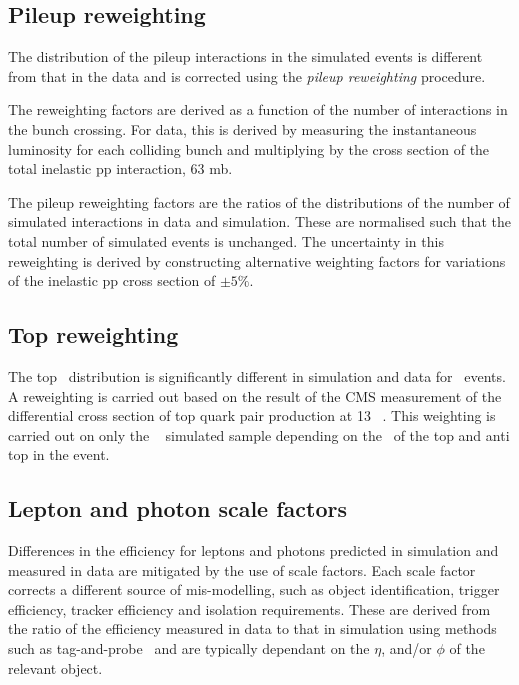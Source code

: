 \subsection{Pileup reweighting}
The distribution of the pileup interactions in the simulated events is different from
that in the data and is corrected using the \emph{pileup reweighting} procedure. 

The reweighting factors are derived as a function of the number 
of interactions in the bunch crossing. For data, this is derived by measuring the instantaneous luminosity
for each colliding bunch and multiplying by the cross section 
of the total inelastic pp interaction, 63 mb. 

The pileup reweighting factors are the ratios of the distributions of the number
of simulated interactions in data and simulation. These are normalised such that the 
total number of simulated events is unchanged. The uncertainty in this reweighting is derived by 
constructing alternative weighting factors for variations 
of the inelastic pp cross section of $\pm5\%$.

\subsection{Top \pt reweighting}

The top \pt~distribution is significantly different in simulation and data for 
\ttbar~events. A reweighting is carried out based on the result of the CMS 
measurement of the differential cross section of top quark pair production 
at 13 \TeV~\cite{toppt}. This weighting is carried out on only the \ttbar~ 
simulated sample depending on the \pt~of the top and anti top in the event.

\subsection{Lepton and photon scale factors}
\label{sec:scale-factor}
Differences in the efficiency for leptons and photons predicted in 
simulation and measured in data are mitigated by the use of scale factors. 
Each scale factor corrects a different source of mis-modelling, such as 
object identification, trigger efficiency, tracker efficiency and isolation requirements.
These are derived from the ratio of the efficiency measured in data to that
in simulation using methods such as tag-and-probe~\cite{MuonReco} 
and are typically dependant on the $\eta$, \pt and/or $\phi$ of the relevant object.

